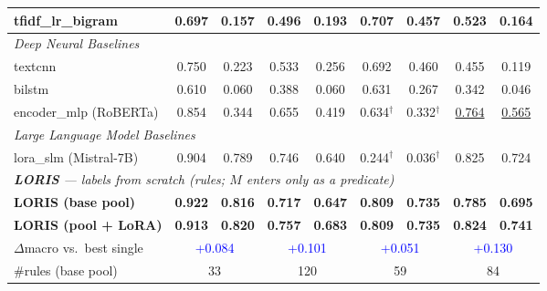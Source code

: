 \documentclass[11pt]{article}
\newcommand{\bld}[1]{\textbf{#1}}\newcommand{\gn}[1]{\textcolor{blue}{#1}}
\begin{document}
\begin{table}[h]
\begin{tabular}{lcccccccc}
\quad tfidf\_lr\_bigram & 0.697 & 0.157 & 0.496 & 0.193 & 0.707 & 0.457 & 0.523 & 0.164 \\
\midrule
\multicolumn{9}{l}{\textit{Deep Neural Baselines}}\\
\quad textcnn & 0.750 & 0.223 & 0.533 & 0.256 & 0.692 & 0.460 & 0.455 & 0.119 \\
\quad bilstm & 0.610 & 0.060 & 0.388 & 0.060 & 0.631 & 0.267 & 0.342 & 0.046 \\
\quad encoder\_mlp (RoBERTa) & 0.854 & 0.344 & 0.655 & 0.419 & 0.634$^\dagger$ & 0.332$^\dagger$ & \underline{0.764} & \underline{0.565} \\
\midrule
\multicolumn{9}{l}{\textit{Large Language Model Baselines}}\\
\quad lora\_slm (Mistral-7B) & 0.904 & 0.789 & 0.746 & 0.640 & 0.244$^\dagger$ & 0.036$^\dagger$ & 0.825 & 0.724 \\
\midrule
\multicolumn{9}{l}{\textit{\bld{LORIS} --- labels from scratch (rules; $M$ enters only as a predicate)}}\\
\rowcolor{blue!8}\bld{\quad LORIS (base pool)} & \bld{0.922} & \bld{0.816} & \bld{0.717} & \bld{0.647} & \bld{0.809} & \bld{0.735} & \bld{0.785} & \bld{0.695} \\
\rowcolor{blue!8}\bld{\quad LORIS (pool + LoRA)} & \bld{0.913} & \bld{0.820} & \bld{0.757} & \bld{0.683} & \bld{0.809} & \bld{0.735} & \bld{0.824} & \bld{0.741} \\
\quad $\Delta$macro vs.\ best single & \multicolumn{2}{c}{\gn{+0.084}} & \multicolumn{2}{c}{\gn{+0.101}} & \multicolumn{2}{c}{\gn{+0.051}} & \multicolumn{2}{c}{\gn{+0.130}} \\
\quad \#rules (base pool) & \multicolumn{2}{c}{33} & \multicolumn{2}{c}{120} & \multicolumn{2}{c}{59} & \multicolumn{2}{c}{84} \\
\bottomrule
\end{tabular}
\end{table}
\end{document}
